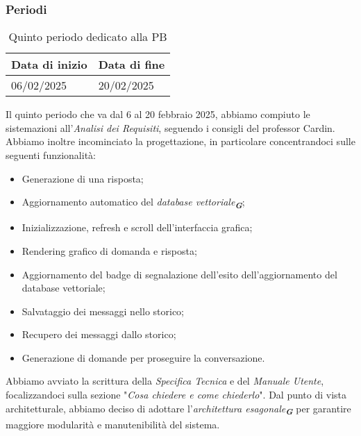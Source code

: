 \subsubsection{Periodi}
\label{sec:periodi_PB}

\label{sec:quinto periodo}
\begin{table}[h!]
    \centering
    \renewcommand{\arraystretch}{1.5} %
    \begin{tabularx}{\textwidth}{|X|X|}\hline
    \rowcolor[HTML]{FFD700} 
    \textbf{Data di inizio} & \textbf{Data di fine} \\ \hline
    06/02/2025 & 20/02/2025 \\ \hline
    \end{tabularx}
    \caption{Quinto periodo dedicato alla PB}
\end{table}
Il quinto periodo che va dal 6 al 20 febbraio 2025, abbiamo compiuto le sistemazioni all'\emph{Analisi dei Requisiti}, seguendo i
consigli del professor Cardin. Abbiamo inoltre incominciato la progettazione, in particolare concentrandoci sulle seguenti funzionalità:
\begin{itemize}
    \item Generazione di una risposta;
    \item Aggiornamento automatico del {\emph{database vettoriale}}\textsubscript{\textit{\textbf{G}}};
    \item Inizializzazione, refresh e scroll dell'interfaccia grafica;
    \item Rendering grafico di domanda e risposta;
    \item Aggiornamento del badge di segnalazione dell'esito dell'aggiornamento del database vettoriale;
    \item Salvataggio dei messaggi nello storico;
    \item Recupero dei messaggi dallo storico;
    \item Generazione di domande per proseguire la conversazione.
\end{itemize}
Abbiamo avviato la scrittura della \emph{Specifica Tecnica} e del \emph{Manuale Utente}, focalizzandoci sulla sezione
"\emph{Cosa chiedere e come chiederlo}".
Dal punto di vista architetturale, abbiamo deciso di adottare l’{\emph{architettura esagonale}}\textsubscript{\textit{\textbf{G}}}
per garantire maggiore modularità e manutenibilità del sistema.

